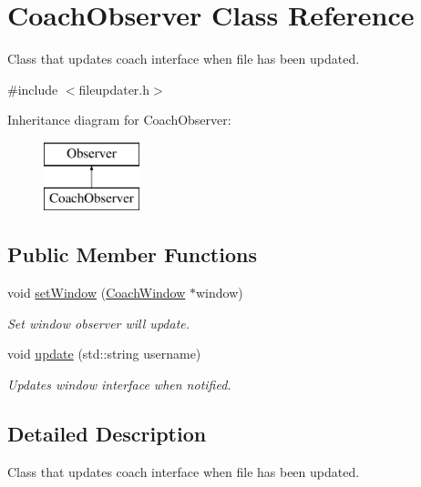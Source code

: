 \hypertarget{classCoachObserver}{}\section{Coach\+Observer Class Reference}
\label{classCoachObserver}


Class that updates coach interface when file has been updated.  




{\ttfamily \#include $<$fileupdater.\+h$>$}

Inheritance diagram for Coach\+Observer\+:\begin{figure}[H]
\begin{center}
\leavevmode
\includegraphics[height=2.000000cm]{classCoachObserver}
\end{center}
\end{figure}
\subsection*{Public Member Functions}
\begin{DoxyCompactItemize}
\item 
void \mbox{\hyperlink{classCoachObserver_ae0416592b3625c117074fad59c49eacc}{set\+Window}} (\mbox{\hyperlink{classCoachWindow}{Coach\+Window}} $\ast$window)
\begin{DoxyCompactList}\small\item\em Set window observer will update. \end{DoxyCompactList}\item 
void \mbox{\hyperlink{classCoachObserver_a374f9d569656139d5dd6cebe73fd4169}{update}} (std\+::string username)
\begin{DoxyCompactList}\small\item\em Updates window interface when notified. \end{DoxyCompactList}\end{DoxyCompactItemize}


\subsection{Detailed Description}
Class that updates coach interface when file has been updated. 

